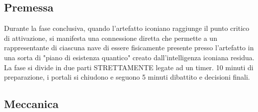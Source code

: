 \documentclass[letterpaper,twocolumn,openany,nodeprecatedcode]{dndbook}
\begin{document}
\subsection{Premessa}
Durante la fase conclusiva, quando l'artefatto iconiano raggiunge il punto critico di attivazione, si manifesta una connessione diretta che permette a un rappresentante di ciascuna nave di essere fisicamente presente presso l'artefatto in una sorta di "piano di esistenza quantico" creato dall'intelligenza iconiana residua. La fase si divide in due parti STRETTAMENTE legate ad un timer. 10 minuti di preparazione, i portali si chiudono e seguono 5 minuti dibattito e decisioni finali.

\subsection{Meccanica}
\end{document}
